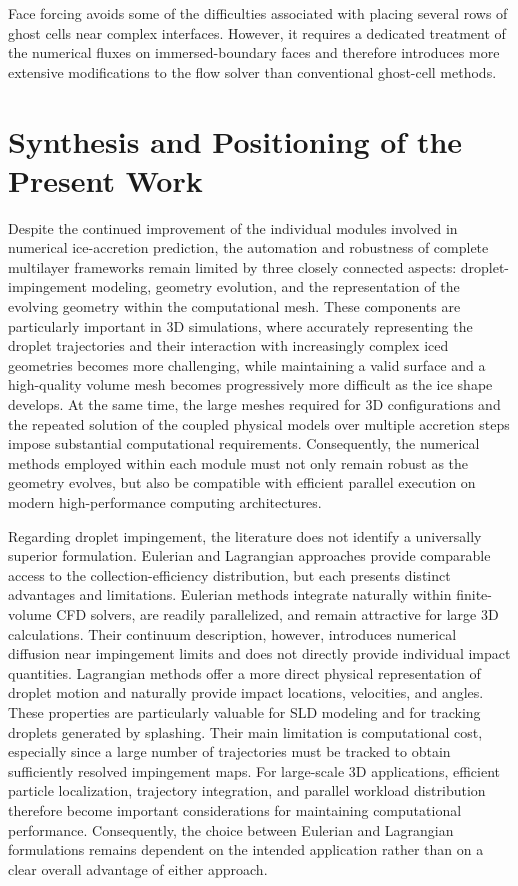 Face forcing avoids some of the difficulties associated with placing several rows of ghost cells near complex interfaces. However, it requires a dedicated treatment of the numerical fluxes on immersed-boundary faces and therefore introduces more extensive modifications to the flow solver than conventional ghost-cell methods.

\section{Synthesis and Positioning of the Present Work}\label{sec:review_synthesis}

Despite the continued improvement of the individual modules involved in numerical ice-accretion prediction, the automation and robustness of complete multilayer frameworks remain limited by three closely connected aspects: droplet-impingement modeling, geometry evolution, and the representation of the evolving geometry within the computational mesh. These components are particularly important in 3D simulations, where accurately representing the droplet trajectories and their interaction with increasingly complex iced geometries becomes more challenging, while maintaining a valid surface and a high-quality volume mesh becomes progressively more difficult as the ice shape develops.
At the same time, the large meshes required for 3D configurations and the repeated solution of the coupled physical models over multiple accretion steps impose substantial computational requirements. Consequently, the numerical methods employed within each module must not only remain robust as the geometry evolves, but also be compatible with efficient parallel execution on modern high-performance computing architectures.

Regarding droplet impingement, the literature does not identify a universally superior formulation. Eulerian and Lagrangian approaches provide comparable access to the collection-efficiency distribution, but each presents distinct advantages and limitations. Eulerian methods integrate naturally within finite-volume CFD solvers, are readily parallelized, and remain attractive for large 3D calculations. Their continuum description, however, introduces numerical diffusion near impingement limits and does not directly provide individual impact quantities. Lagrangian methods offer a more direct physical representation of droplet motion and naturally provide impact locations, velocities, and angles. These properties are particularly valuable for SLD modeling and for tracking droplets generated by splashing. Their main limitation is computational cost, especially since a large number of trajectories must be tracked to obtain sufficiently resolved impingement maps. For large-scale 3D applications, efficient particle localization, trajectory integration, and parallel workload distribution therefore become important considerations for maintaining computational performance. Consequently, the choice between Eulerian and Lagrangian formulations remains dependent on the intended application rather than on a clear overall advantage of either approach.

